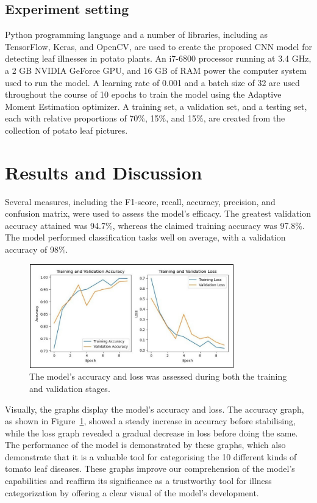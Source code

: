 \documentclass[conference]{IEEEtran}
\begin{document}
\subsection{Experiment setting} 
Python programming language and a number of libraries, including as TensorFlow, Keras, and OpenCV, are used to create the proposed CNN model for detecting leaf illnesses in potato plants. An i7-6800 processor running at 3.4 GHz, a 2 GB NVIDIA GeForce GPU, and 16 GB of RAM power the computer system used to run the model. A learning rate of 0.001 and a batch size of 32 are used throughout the course of 10 epochs to train the model using the Adaptive Moment Estimation optimizer. A training set, a validation set, and a testing set, each with relative proportions of 70\%, 15\%, and 15\%, are created from the collection of potato leaf pictures.

\section{Results and Discussion}

Several measures, including the F1-score, recall, accuracy, precision, and confusion matrix, were used to assess the model's efficacy. The greatest validation accuracy attained was 94.7\%, whereas the claimed training accuracy was 97.8\%. The model performed classification tasks well on average, with a validation accuracy of 98\%.


 \begin{figure}[H]
 \includegraphics[width=8.9cm, height=4.5cm]{Potato Accuracy and Loss.jpg}
\caption{The model's accuracy  and loss was assessed during both the training and validation stages.}
\label{fig: Figure 3}
\end{figure}
Visually, the graphs display the model's accuracy and loss. The accuracy graph, as shown in Figure~\ref{fig: Figure 3}, showed a steady increase in accuracy before stabilising, while the loss graph revealed a gradual decrease in loss before doing the same. The performance of the model is demonstrated by these graphs, which also demonstrate that it is a valuable tool for categorising the 10 different kinds of tomato leaf diseases. These graphs improve our comprehension of the model's capabilities and reaffirm its significance as a trustworthy tool for illness categorization by offering a clear visual of the model's development.
\end{document}
